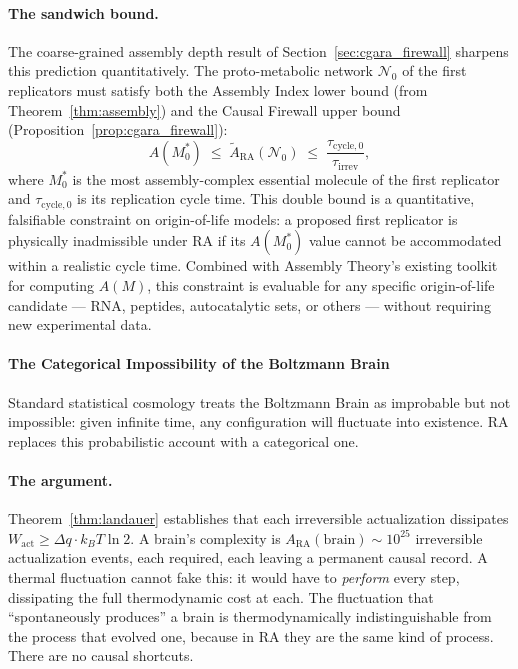 \documentclass[11pt,a4paper]{article}
\theoremstyle{plain}
\theoremstyle{definition}
\theoremstyle{remark}
\newcommand{\ARA}{A_{\mathrm{RA}}}
\begin{document}
\paragraph{The sandwich bound.}
The coarse-grained assembly depth result of
Section~\ref{sec:cgara_firewall} sharpens this prediction quantitatively.
The proto-metabolic network $\mathcal{N}_0$ of the first replicators must satisfy
both the Assembly Index lower bound (from Theorem~\ref{thm:assembly}) and the
Causal Firewall upper bound (Proposition~\ref{prop:cgara_firewall}):
\begin{equation}
  A(M^*_0) \;\leq\; \tilde{A}_{\mathrm{RA}}(\mathcal{N}_0)
  \;\leq\; \frac{\tau_{\mathrm{cycle},0}}{\tau_{\mathrm{irrev}}},
  \label{eq:origin_sandwich}
\end{equation}
where $M^*_0$ is the most assembly-complex essential molecule of the first
replicator and $\tau_{\mathrm{cycle},0}$ is its replication cycle time.
This double bound is a quantitative, falsifiable constraint on origin-of-life
models: a proposed first replicator is physically inadmissible under RA if its
$A(M^*_0)$ value cannot be accommodated within a realistic cycle time.
Combined with Assembly Theory's existing toolkit for computing $A(M)$, this
constraint is evaluable for any specific origin-of-life candidate --- RNA,
peptides, autocatalytic sets, or others --- without requiring new experimental
data.

\paragraph{The Categorical Impossibility of the Boltzmann Brain}

Standard statistical cosmology treats the Boltzmann Brain as improbable but not
impossible: given infinite time, any configuration will fluctuate into existence.
RA replaces this probabilistic account with a categorical one.

\paragraph{The argument.}
Theorem~\ref{thm:landauer} establishes that each irreversible actualization
dissipates $W_{\mathrm{act}} \geq \Delta q \cdot k_B T \ln 2$. A brain's
complexity is $\ARA(\text{brain}) \sim 10^{25}$ irreversible actualization events,
each required, each leaving a permanent causal record. A thermal fluctuation cannot
fake this: it would have to \emph{perform} every step, dissipating the full
thermodynamic cost at each. The fluctuation that ``spontaneously produces'' a brain
is thermodynamically indistinguishable from the process that evolved one, because
in RA they are the same kind of process. There are no causal shortcuts.
\end{document}
